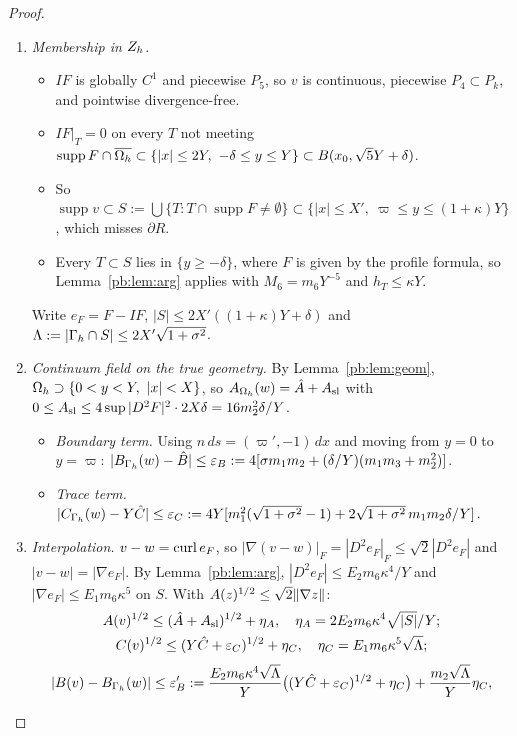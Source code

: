 \begin{proof}
\begin{enumerate}[label=\arabic*.]
\item \emph{Membership in $Z_h$.}
 \begin{itemize}
 \item $IF$ is globally $C^1$ and piecewise $P_5$, so $v$ is continuous, piecewise $P_4\subset P_k$, and pointwise
 divergence-free.
 \item $IF|_T=0$ on every $T$ not meeting $\operatorname{supp}F\cap\overline\Oh\subset\{|x|\le2Y,\ -\delta\le y\le Y\}\subset B(x_0,\sqrt5Y+\delta)$.
 \item So $\operatorname{supp}v\subset S:=\bigcup\{T:T\cap\operatorname{supp}F\ne\emptyset\}\subset\{|x|\le X',\ \varpi\le y\le(1+\kappa)Y\}$,
 which misses $\partial R$.
 \item Every $T\subset S$ lies in $\{y\ge-\delta\}$, where $F$ is given by the profile formula, so Lemma~\ref{pb:lem:arg} applies
 with $M_6=m_6Y^{-5}$ and $h_T\le\kappa Y$.
 \end{itemize}
 Write $e_F=F-IF$, $|S|\le2X'((1+\kappa)Y+\delta)$ and $\Lambda:=|\Gamma_h\cap S|\le2X'\sqrt{1+\sigma^2}$.
\item \emph{Continuum field on the true geometry.} By Lemma~\ref{pb:lem:geom}, $\Omega_h\supset\{0<y<Y,\ |x|<X\}$, so
$A_{\Omega_h}(w)=\hat A+A_{\rm sl}$ with $0\le A_{\rm sl}\le4\sup|D^2F|^2\cdot2X\delta=16m_2^2\delta/Y$.
 \begin{itemize}
 \item \emph{Boundary term.} Using $n\,ds=(\varpi',-1)\,dx$ and moving from $y=0$ to $y=\varpi$:
 $|B_{\Gamma_h}(w)-\hat B|\le\varepsilon_B:=4[\sigma m_1m_2+(\delta/Y)(m_1m_3+m_2^2)]$.
 \item \emph{Trace term.} $|C_{\Gamma_h}(w)-Y\hat C|\le\varepsilon_C:=4Y[m_1^2(\sqrt{1+\sigma^2}-1)+2\sqrt{1+\sigma^2}\,m_1m_2\delta/Y]$.
 \end{itemize}
\item \emph{Interpolation.} $v-w=\operatorname{curl} e_F$, so $|\nabla(v-w)|_F=|D^2e_F|_F\le\sqrt2|D^2e_F|$ and $|v-w|=|\nabla e_F|$. By
Lemma~\ref{pb:lem:arg}, $|D^2e_F|\le E_2m_6\kappa^4/Y$ and $|\nabla e_F|\le E_1m_6\kappa^5$ on $S$. With $A(z)^{1/2}\le\sqrt2\lVert \nabla z\rVert$:
\begin{gather*}A(v)^{1/2}\le(\hat A+A_{\rm sl})^{1/2}+\eta_A,\quad \eta_A=2E_2m_6\kappa^4\sqrt{|S|}/Y;\\
C(v)^{1/2}\le(Y\hat C+\varepsilon_C)^{1/2}+\eta_C,\quad \eta_C=E_1m_6\kappa^5\sqrt\Lambda;\end{gather*}
\[|B(v)-B_{\Gamma_h}(w)|\le\varepsilon_B':=\frac{E_2m_6\kappa^4\sqrt\Lambda}{Y}\bigl((Y\hat C+\varepsilon_C)^{1/2}+\eta_C\bigr)+\frac{m_2\sqrt\Lambda}{Y}\eta_C,\]

\end{enumerate}
\end{proof}
